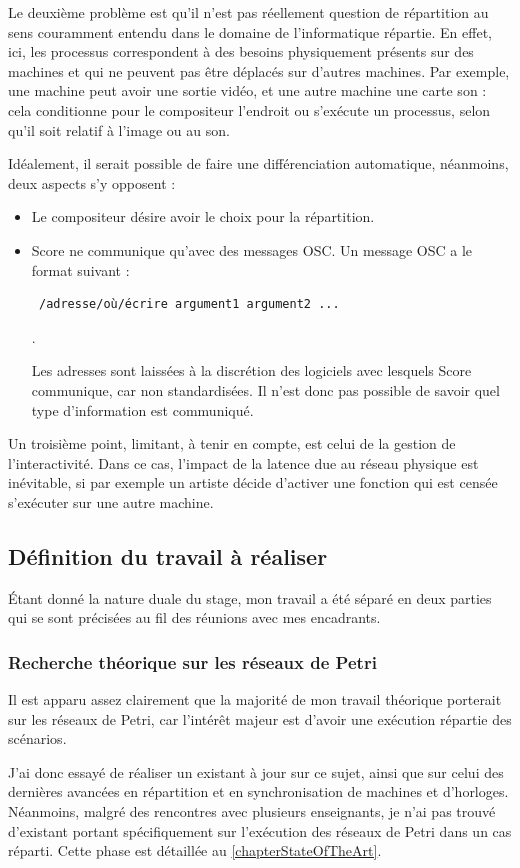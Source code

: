 Le deuxième problème est qu'il n'est pas réellement question de répartition au sens couramment entendu dans le domaine de l'informatique répartie. En effet, ici, les processus correspondent à des besoins physiquement présents sur des machines et qui ne peuvent pas être déplacés sur d'autres machines. Par exemple, une machine peut avoir une sortie vidéo, et une autre machine une carte son : cela conditionne pour le compositeur l'endroit ou s'exécute un processus, selon qu'il soit relatif à l'image ou au son.

Idéalement, il serait possible de faire une différenciation automatique, néanmoins, deux aspects s'y opposent : 
\begin{itemize}
	\item Le compositeur désire avoir le choix pour la répartition.
	\item Score ne communique qu'avec des messages \ac{OSC}. Un message \ac{OSC} a le format suivant : 
	\begin{verbatim} /adresse/où/écrire argument1 argument2 ... \end{verbatim}.
	
	Les adresses sont laissées à la discrétion des logiciels avec lesquels Score communique, car non standardisées. Il n'est donc pas possible de savoir quel type d'information est communiqué. 
\end{itemize}
Un troisième point, limitant, à tenir en compte, est celui de la gestion de l'interactivité. Dans ce cas, l'impact de la latence due au réseau physique est inévitable, si par exemple un artiste décide d'activer une fonction qui est censée s'exécuter sur une autre machine.


\subsection{Définition du travail à réaliser}
Étant donné la nature duale du stage, mon travail a été séparé en deux parties qui se sont précisées au fil des réunions avec mes encadrants.

\subsubsection{Recherche théorique sur les réseaux de Petri}
Il est apparu assez clairement que la majorité de mon travail théorique porterait sur les réseaux de Petri, car l'intérêt majeur est d'avoir une exécution répartie des scénarios.

J'ai donc essayé de réaliser un existant à jour sur ce sujet, ainsi que sur celui des dernières avancées en répartition et en synchronisation de machines et d'horloges.
Néanmoins, malgré des rencontres avec plusieurs enseignants, je n'ai pas trouvé d'existant portant spécifiquement sur l'exécution des réseaux de Petri dans un cas réparti.
Cette phase est détaillée au \cref{chapterStateOfTheArt}.

